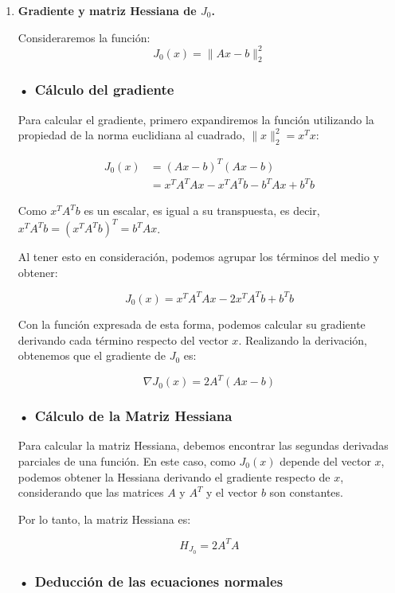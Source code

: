 \documentclass{article}
\begin{document}
\begin{enumerate}[label=\roman*., widest=iii]
  \item \textbf{Gradiente y matriz Hessiana de $J_0$.}

  Consideraremos la función:
  \[
  J_0(x)=\|Ax-b\|_2^2
  \]

  \subsubsection*{• Cálculo del gradiente}

  Para calcular el gradiente, primero expandiremos la función utilizando la propiedad de la norma euclidiana al cuadrado, \(\|x\|_2^2=x^Tx\):

  \[
  \begin{aligned}
  J_0(x) &= (Ax-b)^T(Ax-b)\\
  &=x^TA^TAx-x^TA^Tb-b^TAx+b^Tb
  \end{aligned}
  \]

  Como \(x^TA^Tb\) es un escalar, es igual a su transpuesta, es decir, \(x^TA^Tb=(x^TA^Tb)^T=b^TAx\).

  Al tener esto en consideración, podemos agrupar los términos del medio y obtener:

  \[
  J_0(x)=x^TA^TAx-2x^TA^Tb+b^Tb
  \]

  Con la función expresada de esta forma, podemos calcular su gradiente derivando cada término respecto del vector \(x\). Realizando la derivación, obtenemos que el gradiente de \(J_0\) es:

  \[
  \boxed{\nabla J_0(x)=2A^T(Ax-b)}
  \]

  \subsubsection*{• Cálculo de la Matriz Hessiana}

  Para calcular la matriz Hessiana, debemos encontrar las segundas derivadas parciales de una función. En este caso, como \(J_0(x)\) depende del vector \(x\), podemos obtener la Hessiana derivando el gradiente respecto de \(x\), considerando que las matrices \(A\) y \(A^T\) y el vector \(b\) son constantes.

  Por lo tanto, la matriz Hessiana es:

  \[
  \boxed{H_{J_0}=2A^TA}
  \]

  \bigskip
  \bigskip
  \bigskip
  \bigskip

  \subsubsection*{• Deducción de las ecuaciones normales}


\end{enumerate}
\end{document}
